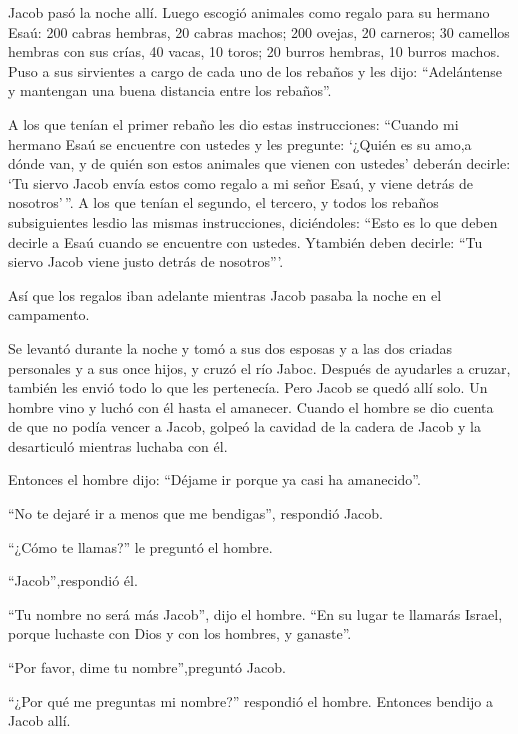  Jacob pasó la noche allí. Luego escogió animales como
regalo para su hermano Esaú:  200 cabras hembras, 20 cabras
machos; 200 ovejas, 20 carneros;  30 camellos hembras con
sus crías, 40 vacas, 10 toros; 20 burros hembras, 10 burros machos.
 Puso a sus sirvientes a cargo de cada uno de los rebaños y
les dijo: ``Adelántense y mantengan una buena distancia entre los
rebaños''.

 A los que tenían el primer rebaño les dio estas
instrucciones: ``Cuando mi hermano Esaú se encuentre con ustedes y les
pregunte: `¿Quién es su amo,a dónde van, y de quién son estos animales
que vienen con ustedes'  deberán decirle: `Tu siervo Jacob
envía estos como regalo a mi señor Esaú, y viene detrás de
nosotros'\,''.  A los que tenían el segundo, el tercero, y
todos los rebaños subsiguientes lesdio las mismas instrucciones,
diciéndoles: ``Esto es lo que deben decirle a Esaú cuando se encuentre
con ustedes.  Ytambién deben decirle: ``Tu siervo Jacob
viene justo detrás de nosotros'''.

 Así que los regalos iban adelante mientras Jacob pasaba la
noche en el campamento.

 Se levantó durante la noche y tomó a sus dos esposas y a
las dos criadas personales y a sus once hijos, y cruzó el río Jaboc.
 Después de ayudarles a cruzar, también les envió todo lo
que les pertenecía.  Pero Jacob se quedó allí solo. Un
hombre vino y luchó con él hasta el amanecer.  Cuando el
hombre se dio cuenta de que no podía vencer a Jacob, golpeó la cavidad
de la cadera de Jacob y la desarticuló mientras luchaba con él.

 Entonces el hombre dijo: ``Déjame ir porque ya casi ha
amanecido''.

``No te dejaré ir a menos que me bendigas'', respondió Jacob.

 ``¿Cómo te llamas?'' le preguntó el hombre.

``Jacob'',respondió él.

 ``Tu nombre no será más Jacob'', dijo el hombre. ``En su
lugar te llamarás Israel, porque luchaste con Dios y con los hombres, y
ganaste''.

 ``Por favor, dime tu nombre'',preguntó Jacob.

``¿Por qué me preguntas mi nombre?'' respondió el hombre. Entonces
bendijo a Jacob allí.

